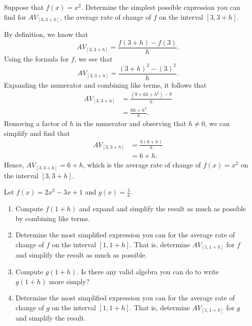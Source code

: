 \documentclass{ximera}
\begin{document}
\begin{example}
Suppose that $f(x) = x^2$.  Determine the simplest possible expression you can find for $AV_{[3,3+h]}$, the average rate of change of $f$ on the interval $[3,3+h]$.

\begin{explanation}
By definition, we know that%
\begin{equation*}
AV_{[3,3+h]} = \frac{f(3+h)-f(3)}{h}.
\end{equation*}
Using the formula for $f$, we see that%
\begin{equation*}
AV_{[3,3+h]} = \frac{(3+h)^2-(3)^2}{h}.
\end{equation*}
Expanding the numerator and combining like terms, it follows that%
\begin{align*}
AV_{[3,3+h]} &= \frac{(9+6h+h^2)-9}{h}\\
&= \frac{6h + h^2}{h}\text{.}
\end{align*}
Removing a factor of $h$ in the numerator and observing that $h \ne 0$, we can simplify and find that%
\begin{align*}
AV_{[3,3+h]} &= \frac{h(6 + h)}{h}\\
&= 6+h\text{.}
\end{align*}
Hence, $AV_{[3,3+h]} = 6+h$, which is the average rate of change of $f(x) = x^2$ on the interval $[3,3+h]$.  
\end{explanation}

\end{example}

\begin{exploration}
Let $f(x) = 2x^2 - 3x + 1$ and $g(x) = \frac{5}{x}$.%
\begin{enumerate}[label=\alph*.]
\item Compute $f(1+h)$ and expand and simplify the result as much as possible by combining like terms.
\item Determine the most simplified expression you can for the average rate of change of $f$ on the interval $[1,1+h]$. That is, determine $AV_{[1,1+h]}$ for $f$ and simplify the result as much as possible.
\item Compute $g(1+h)$. Is there any valid algebra you can do to write $g(1+h)$ more simply?
\item Determine the most simplified expression you can for the average rate of change of $g$ on the interval $[1,1+h]$. That is, determine $AV_{[1,1+h]}$ for $g$ and simplify the result.
\end{enumerate}
\end{exploration}
\end{document}
